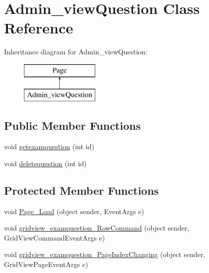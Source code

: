 \hypertarget{class_admin__view_question}{}\section{Admin\+\_\+view\+Question Class Reference}
\label{class_admin__view_question}
Inheritance diagram for Admin\+\_\+view\+Question\+:\begin{figure}[H]
\begin{center}
\leavevmode
\includegraphics[height=2.000000cm]{class_admin__view_question}
\end{center}
\end{figure}
\subsection*{Public Member Functions}
\begin{DoxyCompactItemize}
\item 
void \mbox{\hyperlink{class_admin__view_question_aeac557e2a0f38dfa09e84cc666d28a80}{getexamquestion}} (int id)
\item 
void \mbox{\hyperlink{class_admin__view_question_a08bed2d7f913bd5dbe475cb57152de92}{deletequestion}} (int id)
\end{DoxyCompactItemize}
\subsection*{Protected Member Functions}
\begin{DoxyCompactItemize}
\item 
void \mbox{\hyperlink{class_admin__view_question_afbbf9adb1bb03b39141a9ad6acb931e3}{Page\+\_\+\+Load}} (object sender, Event\+Args e)
\item 
void \mbox{\hyperlink{class_admin__view_question_a68826c52bf3fe670bfaf6491f93bc32f}{gridview\+\_\+examquestion\+\_\+\+Row\+Command}} (object sender, Grid\+View\+Command\+Event\+Args e)
\item 
void \mbox{\hyperlink{class_admin__view_question_aeef8baaf908915f0230e4a5530bf326c}{gridview\+\_\+examquestion\+\_\+\+Page\+Index\+Changing}} (object sender, Grid\+View\+Page\+Event\+Args e)
\end{DoxyCompactItemize}
